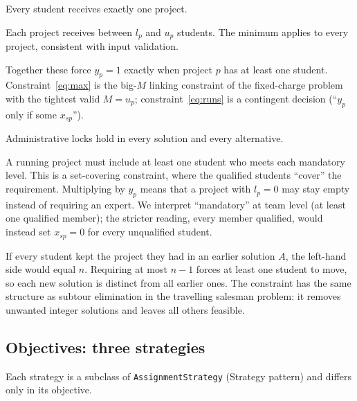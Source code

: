 \documentclass[11pt,a4paper]{article}
\newcommand{\code}[1]{\texttt{#1}}
\begin{document}
\begin{description}[leftmargin=0pt,font=\normalfont\bfseries]
  \item[\eqref{eq:one} One project per student.] Every student receives
        exactly one project.
  \item[\eqref{eq:min}--\eqref{eq:max} Capacity.] Each project receives
        between $l_p$ and $u_p$ students. The minimum applies to every project,
        consistent with input validation.
  \item[\eqref{eq:max}--\eqref{eq:runs} Linking $y_p$ to $x_{sp}$.] Together
        these force $y_p = 1$ exactly when project $p$ has at least one
        student. Constraint~\eqref{eq:max} is the big-$M$ linking constraint
        of the fixed-charge problem with the tightest
        valid $M = u_p$; constraint~\eqref{eq:runs} is a contingent decision
        (``$y_p$ only if some $x_{sp}$'').
  \item[\eqref{eq:fixed} Fixed assignments.] Administrative locks hold in
        every solution and every alternative.
  \item[\eqref{eq:mand} Mandatory skills.] A running project must include
        at least one student who meets each mandatory level. This is a
        set-covering constraint, where the qualified students
        ``cover'' the requirement. Multiplying by $y_p$ means that a project
        with $l_p = 0$ may stay empty instead of requiring an expert. We
        interpret ``mandatory'' at team level (at least one qualified member);
        the stricter reading, every member qualified, would instead set
        $x_{sp} = 0$ for every unqualified student.
  \item[\eqref{eq:nogood} No-good cuts.] If every student kept the project
        they had in an earlier solution $A$, the left-hand side would equal
        $n$. Requiring at most $n - 1$ forces at least one student to move, so
        each new solution is distinct from all earlier ones. The constraint
        has the same structure as subtour elimination in the travelling
        salesman problem: it removes unwanted integer solutions and leaves all
        others feasible.
\end{description}

\subsection{Objectives: three strategies}
\label{sec:obj}

Each strategy is a subclass of \code{AssignmentStrategy} (Strategy pattern)
and differs only in its objective.
\end{document}

